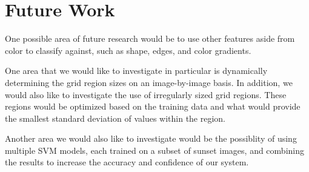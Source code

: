 \documentclass{article}
\begin{document}
\section{Future Work}
One possible area of future research would be to use other features aside from color to classify against, such as shape, edges, and color gradients.

One area that we would like to investigate in particular is dynamically determining the grid region sizes on an image-by-image basis. In addition, we would also like to investigate the use of irregularly sized grid regions. These regions would be optimized based on the training data and what would provide the smallest standard deviation of values within the region. 

Another area we would also like to investigate would be the possiblity of using multiple SVM models, each trained on a subset of sunset images, and combining the results to increase the accuracy and confidence of our system. 
\end{document}

